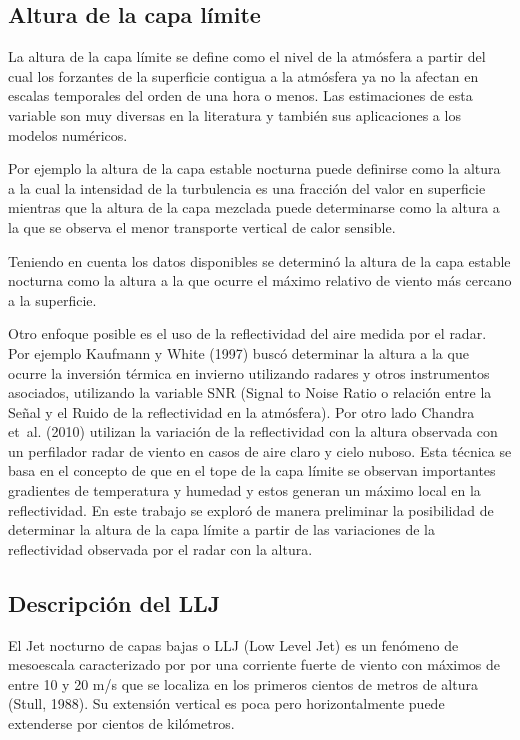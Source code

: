 \documentclass[12pt,spanish,oneside, a4paper]{book}
\begin{document}
\subsection{\texorpdfstring{Altura de la capa límite
\label{sec-pbh}}{Altura de la capa límite }}\label{altura-de-la-capa-limite}

La altura de la capa límite se define como el nivel de la atmósfera a
partir del cual los forzantes de la superficie contigua a la atmósfera
ya no la afectan en escalas temporales del orden de una hora o menos.
Las estimaciones de esta variable son muy diversas en la literatura y
también sus aplicaciones a los modelos numéricos.

Por ejemplo la altura de la capa estable nocturna puede definirse como
la altura a la cual la intensidad de la turbulencia es una fracción del
valor en superficie mientras que la altura de la capa mezclada puede
determinarse como la altura a la que se observa el menor transporte
vertical de calor sensible.

Teniendo en cuenta los datos disponibles se determinó la altura de la
capa estable nocturna como la altura a la que ocurre el máximo relativo
de viento más cercano a la superficie.

Otro enfoque posible es el uso de la reflectividad del aire medida por
el radar. Por ejemplo Kaufmann y White (1997) buscó determinar la altura
a la que ocurre la inversión térmica en invierno utilizando radares y
otros instrumentos asociados, utilizando la variable SNR (Signal to
Noise Ratio o relación entre la Señal y el Ruido de la reflectividad en
la atmósfera). Por otro lado Chandra et~al. (2010) utilizan la variación
de la reflectividad con la altura observada con un perfilador radar de
viento en casos de aire claro y cielo nuboso. Esta técnica se basa en el
concepto de que en el tope de la capa límite se observan importantes
gradientes de temperatura y humedad y estos generan un máximo local en
la reflectividad. En este trabajo se exploró de manera preliminar la
posibilidad de determinar la altura de la capa límite a partir de las
variaciones de la reflectividad observada por el radar con la altura.

\subsection{Descripción del LLJ}\label{descripcion-del-llj}

El Jet nocturno de capas bajas o LLJ (Low Level Jet) es un fenómeno de
mesoescala caracterizado por por una corriente fuerte de viento con
máximos de entre 10 y 20 m/s que se localiza en los primeros cientos de
metros de altura (Stull, 1988). Su extensión vertical es poca pero
horizontalmente puede extenderse por cientos de kilómetros.
\end{document}

